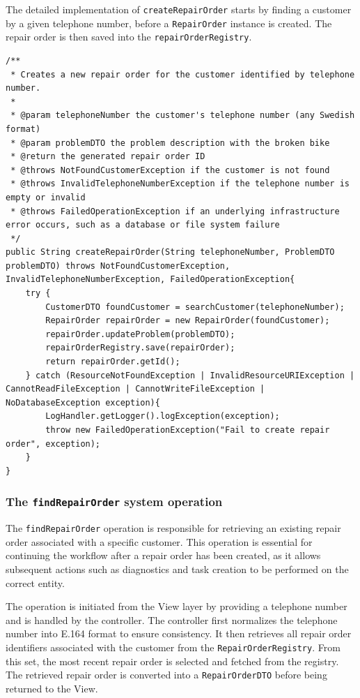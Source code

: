 \documentclass[a4paper]{scrartcl}
\begin{document}
The detailed implementation of \texttt{createRepairOrder} starts by finding a customer by a given telephone number, before a \texttt{RepairOrder} instance is created. The repair order is then saved into the \texttt{repairOrderRegistry}.

\begin{lstlisting}[style=javastyle, caption={Creating a new repair order using \texttt{createRepairOrder} method in \texttt{ReceptionistController}}]
/**
 * Creates a new repair order for the customer identified by telephone number.
 *
 * @param telephoneNumber the customer's telephone number (any Swedish format)
 * @param problemDTO the problem description with the broken bike
 * @return the generated repair order ID
 * @throws NotFoundCustomerException if the customer is not found
 * @throws InvalidTelephoneNumberException if the telephone number is empty or invalid
 * @throws FailedOperationException if an underlying infrastructure error occurs, such as a database or file system failure
 */
public String createRepairOrder(String telephoneNumber, ProblemDTO problemDTO) throws NotFoundCustomerException, InvalidTelephoneNumberException, FailedOperationException{
    try {
        CustomerDTO foundCustomer = searchCustomer(telephoneNumber);
        RepairOrder repairOrder = new RepairOrder(foundCustomer);
        repairOrder.updateProblem(problemDTO);
        repairOrderRegistry.save(repairOrder);
        return repairOrder.getId();
    } catch (ResourceNotFoundException | InvalidResourceURIException | CannotReadFileException | CannotWriteFileException | NoDatabaseException exception){
        LogHandler.getLogger().logException(exception);
        throw new FailedOperationException("Fail to create repair order", exception);
    }
}
\end{lstlisting}

\subsubsection{The \texttt{findRepairOrder} system operation}

The \texttt{findRepairOrder} operation is responsible for retrieving an existing repair order associated with a specific customer. This operation is essential for continuing the workflow after a repair order has been created, as it allows subsequent actions such as diagnostics and task creation to be performed on the correct entity.

The operation is initiated from the View layer by providing a telephone number and is handled by the controller. The controller first normalizes the telephone number into E.164 format to ensure consistency. It then retrieves all repair order identifiers associated with the customer from the \texttt{RepairOrderRegistry}. From this set, the most recent repair order is selected and fetched from the registry. The retrieved repair order is converted into a \texttt{RepairOrderDTO} before being returned to the View.
\end{document}
